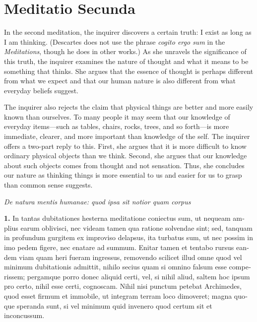 \chapter{Meditatio Secunda}


In the second meditation, the inquirer discovers a certain truth: I exist as long as I am thinking. (Descartes does not use the phrase \textit{cogito ergo sum} in the \textit{Meditations}, though he does in other works.) As she unravels the significance of this truth, the inquirer examines the nature of thought and what it means to be something that thinks. She argues that the essence of thought is perhaps different from what we expect and that our human nature is also different from what everyday beliefs suggest.

The inquirer also rejects the claim that physical things are better and more easily known than ourselves. To many people it may seem that our knowledge of everyday items---such as tables, chairs, rocks, trees, and so forth---is more immediate, clearer, and more important than knowledge of the self. The inquirer offers a two-part reply to this. First, she argues that it is more difficult to know ordinary physical objects than we think. Second, she argues that our knowledge about such objects comes from thought and not sensation. Thus, she concludes our nature as thinking things is more essential to us and easier for us to grasp than common sense suggests.

\clearpage

\clearpage
\begin{center}
    \beginnumbering
    \numberlinefalse
    \pstart
    \textit{De natura mentis humanae: quod ipsa sit notior quam corpus}
    \pend
    \endnumbering
\end{center}

\beginnumbering
\pstart
\begin{latin}
    \textenglish{\textbf{1.}} In tantas dubitationes hesterna meditatione coniectus sum, ut nequeam amplius earum oblivisci, nec videam tamen qua ratione solvendae sint; sed, tanquam in profundum gurgitem ex improviso delapsus, ita turbatus sum, ut nec possim in imo pedem figere, nec enatare ad summum. Enitar tamen et tentabo rursus eandem viam quam heri fueram ingressus, removendo scilicet illud omne quod vel minimum dubitationis admittit, nihilo secius quam si omnino falsum esse comperissem; pergamque porro donec aliquid certi, vel, si nihil aliud, saltem hoc ipsum pro certo, nihil esse certi, cognoscam. Nihil nisi punctum petebat Archimedes, quod esset firmum et immobile, ut integram terram loco dimoveret; magna quoque speranda sunt, si vel minimum quid invenero quod certum sit et inconcussum.
\end{latin}
\pend
\endnumbering

